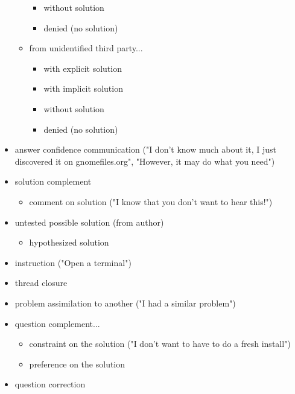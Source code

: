\documentclass[11pt]{article}
\begin{document}
\begin{itemize}
\begin{itemize}
\begin{itemize}
					\item without solution
					\item denied (no solution)
				\end{itemize}
			\item from unidentified third party...
				\begin{itemize}
					\item with explicit solution
					\item with implicit solution
					\item without solution
					\item denied (no solution)
				\end{itemize}
		\end{itemize}
	\item answer confidence communication ("I don't know much about it, I just discovered it on gnomefiles.org", "However, it may do what you need")
	\item solution complement
		\begin{itemize}
			\item comment on solution ("I know that you don't want to hear this!")
		\end{itemize}
	\item untested possible solution (from author)
		\begin{itemize}
			\item hypothesized solution
		\end{itemize}
	\item instruction ("Open a terminal")
	\item thread closure
	\item problem assimilation to another ("I had a similar problem")
	\item question complement...
		\begin{itemize}
			\item constraint on the solution ("I don't want to have to do a fresh install")
			\item preference on the solution
		\end{itemize}
	\item question correction
\end{itemize}

\end{document}
